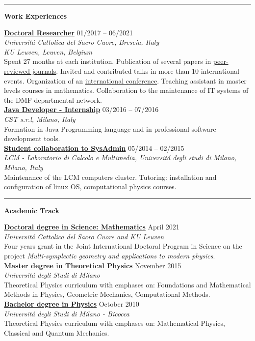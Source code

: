 \documentclass[a4paper]{article}
\newcommand{\block}[1]{\hrule \vspace{0.2cm} \textbf{\Large #1} \vspace{0.2cm}}
\newcommand{\voice}[5]{\href{#4}{\textbf{#1}} \hfill #2 \\ \textit{#3} \\ {\small #5} \vspace{0.2cm} \\}
\begin{document}
\begin{minipage}[t]{0.6\columnwidth}

    \block{Work Experiences}
   
 
    \voice{Doctoral Researcher}
    	{01/2017 -- 06/2021}
    	{Universit\'a Cattolica del Sacro Cuore, Brescia, Italy \\ KU Leuven, Leuven, Belgium}
    	{https://scuoledidottorato.unicatt.it/phdschools/science-10574.html}
    	{Spent 27 months at each institution.
		Publication of several papers in \href{https://orcid.org/0000-0002-8829-1943}{peer-reviewed journals}. 
		Invited and contributed talks in more than 10 international events. 
		Organization of an \href{https://wis.kuleuven.be/events/multisymplectic}{international conference}.
		Teaching assistant in master levels courses in mathematics.
		Collaboration to the maintenance of IT systems of the DMF departmental network.}	
    \voice{Java Developer - Internship}
        {03/2016  -- 07/2016}
        {CST s.r.l, Milano, Italy}
        {https://www.csttech.it/}       
        {Formation in Java Programming language and in professional software development tools.}
    \voice{Student collaboration to SysAdmin}
        {05/2014 -- 02/2015}
        {LCM - Laboratorio di Calcolo e Multimedia, Universit\'a degli studi di Milano, Milano, Italy}
        {https://lcm.mi.infn.it/}       
        {Maintenance of the LCM computers cluster. Tutoring: installation and configuration of linux OS, computational physics courses.\vspace{-0.25cm}}
 

    \block{Academic Track}

    
    \voice{Doctoral degree in Science: Mathematics}
        {April 2021}
        {Universit\'a Cattolica del Sacro Cuore and KU Leuven}
        {https://web.archive.org/save/http://scuoledidottorato.unicatt.it/phdschools/science-research-projects}       
        {Four years grant in the Joint International Doctoral Program in Science on the project \emph{Multi-symplectic geometry and applications to modern physics}. }
    \voice{Master degree in Theoretical Physics}
        {November 2015}
        {Universit\'a degli Studi di Milano}
        {https://fisica-lm.cdl.unimi.it/it}       
        {Theoretical Physics curriculum with emphases on: Foundations and Mathematical Methods in Physics, Geometric Mechanics, Computational Methods.}
    \voice{Bachelor degree in Physics}
        {October 2010}
        {Universit\'a degli Studi di Milano - Bicocca}
        {https://www.fisica.unimib.it/en}       
        {Theoretical Physics curriculum with emphases on: Mathematical-Physics, Classical and Quantum Mechanics.\vspace{-0.25cm}}

















\end{minipage} 
\end{document}
